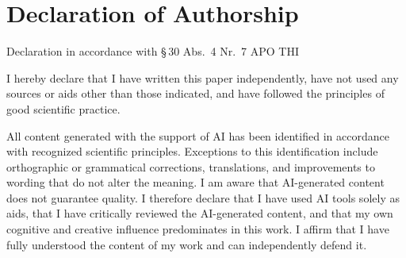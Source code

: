 %
%
\cleardoublepage
\thispagestyle{plain}

\chapter*{Declaration of Authorship}

\noindent
{\small Declaration in accordance with \S\,30 Abs.\ 4 Nr.\ 7 APO THI}

\vspace{8mm}

\noindent
I hereby declare that I have written this paper independently, have not used any
sources or aids other than those indicated, and have followed the principles of
good scientific practice.

\vspace{4mm}

\noindent
All content generated with the support of AI has been identified in accordance
with recognized scientific principles. Exceptions to this identification include
orthographic or grammatical corrections, translations, and improvements to
wording that do not alter the meaning. I am aware that AI-generated content does
not guarantee quality. I therefore declare that I have used AI tools solely as
aids, that I have critically reviewed the AI-generated content, and that my own
cognitive and creative influence predominates in this work. I affirm that I have
fully understood the content of my work and can independently defend it.

